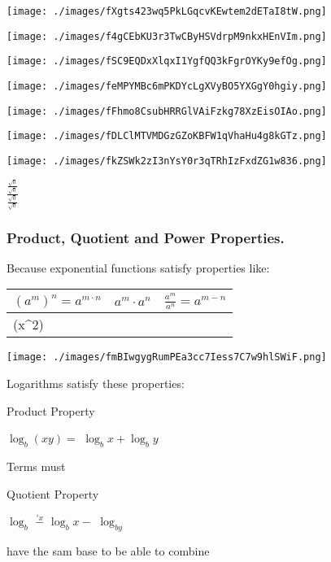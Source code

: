 \documentclass{book}
\begin{document}
\texttt{[image: ./images/fXgts423wq5PkLGqcvKEwtem2dETaI8tW.png]}

\texttt{[image: ./images/f4gCEbKU3r3TwCByHSVdrpM9nkxHEnVIm.png]}

\texttt{[image: ./images/fSC9EQDxXlqxI1YgfQQ3kFgrOYKy9efOg.png]}

\texttt{[image: ./images/feMPYMBc6mPKDYcLgXVyBO5YXGgY0hgiy.png]}

\texttt{[image: ./images/fFhmo8CsubHRRGlVAiFzkg78XzEisOIAo.png]}

\texttt{[image: ./images/fDLClMTVMDGzGZoKBFW1qVhaHu4g8kGTz.png]}

\texttt{[image: ./images/fkZSWk2zI3nYsY0r3qTRhIzFxdZG1w836.png]}

\(\frac{\frac{\sqrt{0}}{\sqrt{0}}}{\frac{\sqrt{0}}{\sqrt{0}}}\)

\subsubsection{Product, Quotient and Power
	Properties.}\label{product-quotient-and-power-properties.}

Because exponential functions satisfy properties like:

\begin{longtable}[]{@{}lll@{}}
	\toprule\noalign{}
	\((a^m)^n=a^{m \cdot n}\) & \(a^m \cdot a^n\) &
	\(\frac{a^m}{a^n}=a^{m-n}\)                     \\
	\midrule\noalign{}
	\endhead
	\bottomrule\noalign{}
	\endlastfoot
	(x\^{}2)                  &                   & \\
\end{longtable}

\texttt{[image: ./images/fmBIwgygRumPEa3cc7Iess7C7w9hlSWiF.png]}

Logarithms satisfy these properties:

Product Property

\(\log_b(xy)=\) \(\log_{b}x+\log_{b}y\)

Terms must

Quotient Property

\(\log_{b}\) \(\stackrel{'x}{-}\) \(\log_bx-\) \(\log_{by}\)

have the sam base to be able to combine
\end{document}
